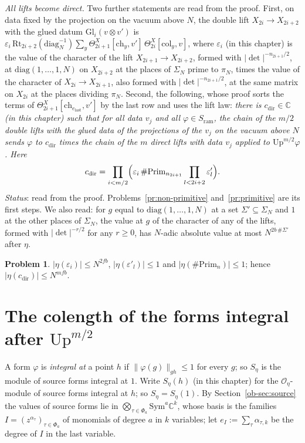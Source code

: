 \documentclass[reqno]{amsart}
\newcounter{chap}
\theoremstyle{plain}
\theoremstyle{definition}
\newtheorem{problem}{Problem}[section]
\theoremstyle{remark}
\newcommand{\C}{{\mathbb{C}}}
\newcommand{\Oc}{\mathcal O}
\newcommand{\ram}{\mathrm{ram}}
\newcommand{\Up}{\mathrm{Up}}
\newcommand{\Rt}{\mathrm{Rt}}
\newcommand{\col}{\mathrm{col}}
\newcommand{\ch}{\mathrm{ch}}
\newcommand{\Prim}{\mathrm{Prim}}
\newcommand{\dg}{\mathrm{diag}_N}
\newcommand{\elast}{e_{\mathrm{last}}}
\newcommand{\cdir}{c_{\mathrm{dir}}}
\newcommand{\nb}[1]{\lVert #1 \rVert}
\begin{document}
\emph{All lifts become direct.}  Two further statements are read from the proof.  First, on data fixed by the projection on the vacuum above \(N\), the double lift \(X_{2i} \to X_{2i+2}\) with the glued datum \(\mathrm{Gl}_i(v \otimes v')\) is \(\varepsilon_i\,\Rt_{2i+2}(\dg^{-1})\sum_y\Theta^X_{2i+1}[\ch_y, v']\,\Theta^X_{2i}[\col_y, v]\), where \(\varepsilon_i\) (in this chapter) is the value of the character of the lift \(X_{2i+1} \to X_{2i+2}\), formed with \(\lvert\det\rvert^{-n_{2i+1}/2}\), at \(\mathrm{diag}(1,\dots,1,N)\) on \(X_{2i+2}\) at the places of \(\Sigma_N\) prime to \(\pi_N\), times the value of the character of \(X_{2i} \to X_{2i+1}\), also formed with \(\lvert\det\rvert^{-n_{2i+1}/2}\), at the same matrix on \(X_{2i}\) at the places dividing \(\pi_N\).  Second, the following, whose proof sorts the terms of \(\Theta^X_{2i+1}[\ch_{\elast}, v']\) by the last row and uses the lift law:
\emph{there is \(\cdir \in \C\) (in this chapter) such that for all data \(v_j\) and all \(\varphi \in S_\ram\), the chain of the \(m/2\) double lifts with the glued data of the projections of the \(v_j\) on the vacuum above \(N\) sends \(\varphi\) to \(\cdir\) times the chain of the \(m\) direct lifts with data \(v_j\) applied to \(\Up^{m/2}\varphi\).  Here}
\[
  \cdir = \prod_{i < m/2}\Bigl(\varepsilon_i\,\#\Prim_{n_{2i+1}}\prod_{l < 2i+2}\varepsilon'_l\Bigr) .
\]
\emph{Status}: read from the proof.  Problems~\ref{pr:non-primitive} and~\ref{pr:primitive} are its first steps.  We also read: for \(g\) equal to \(\mathrm{diag}(1, \dots, 1, N)\) at a set \(\Sigma'\subseteq\Sigma_N\) and \(1\) at the other places of \(\Sigma_N\), the value at \(g\) of the character of any of the lifts, formed with \(\lvert\det\rvert^{-r/2}\) for any \(r \ge 0\), has \(N\)-adic absolute value at most \(N^{2b\,\#\Sigma'}\) after \(\eta\).

\begin{problem}\label{pr:scalar}
\(\lvert\eta(\varepsilon_i)\rvert \le N^{2fb}\), \(\lvert\eta(\varepsilon'_l)\rvert \le 1\) and \(\lvert\eta(\#\Prim_n)\rvert \le 1\); hence \(\lvert\eta(\cdir)\rvert \le N^{mfb}\).
\end{problem}

\section{The colength of the forms integral after \texorpdfstring{\(\Up^{m/2}\)}{Up}}\label{sec:colength}

A form \(\varphi\) is \emph{integral at} a point \(h\) if \(\nb{\varphi(g)}_{gh} \le 1\) for every \(g\); so \(S_\eta\) is the module of source forms integral at \(1\).  Write \(S_\eta(h)\) (in this chapter) for the \(\Oc_\eta\)-module of source forms integral at \(h\); so \(S_\eta = S_\eta(1)\).  By Section~\ref{ob-sec:source} the values of source forms lie in \(\bigotimes_{\tau \in \Phi_a}\mathrm{Sym}^a\C^k\), whose basis is the families \(I = (z^{\alpha_\tau})_{\tau \in \Phi_a}\) of monomials of degree \(a\) in \(k\) variables; let \(e_I := \sum_\tau \alpha_{\tau,k}\) be the degree of \(I\) in the last variable.
\end{document}
